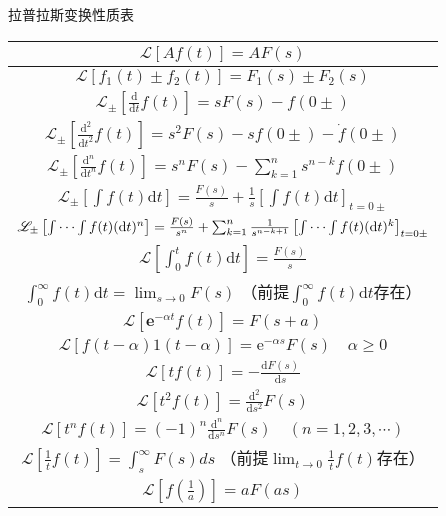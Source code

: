 \newpage
拉普拉斯变换性质表

\begin{centering}
    \renewcommand{\arraystretch}{2}
    \begin{longtable}{|c|}
        \hline
        $\mathscr{L}[A f(t)]=A F(s)$\\  \hline
        $\mathscr{L}\left[f_{1}(t) \pm f_{2}(t)\right]=F_{1}(s) \pm F_{2}(s)$\\  \hline
        $\mathscr{L}_{ \pm}\left[\frac{\mathrm{d}}{\mathrm{d} t} f(t)\right]=s F(s)-f(0 \pm)$\\  \hline
        $\mathscr{L}_{ \pm}\left[\frac{\mathrm{d}^{2}}{\mathrm{d} t^{2}} f(t)\right]=s^{2} F(s)-s f(0 \pm)-\dot{f}(0 \pm)$\\  \hline
        $\mathscr{L}_{ \pm}\left[\frac{\mathrm{d}^{n}}{\mathrm{d} t^{n}} f(t)\right]=s^{n} F(s)-\sum_{k=1}^{n} s^{n-k} f(0 \pm)$\\  \hline
        $\mathscr{L}_{ \pm}\left[\int f(t) \mathrm{d} t\right]=\frac{F(s)}{s}+\frac{1}{s}\left[\int f(t) \mathrm{d} t\right]_{t=0 \pm}$\\  \hline
        $\mathscr{L}_{\pm}\left[\int\cdots\int f(t)(\mathrm{d}t)^n\right]=\frac{F(s)}{s^n}+\sum_{k=1}^n\frac{1}{s^{n-k+1}}\left[\int\cdots\int f(t)(\mathrm{d}t)^k\right]_{t=0\pm}$\\  \hline
        $\mathscr{L}\left[\int_{0}^{t} f(t) \mathrm{d} t\right]=\frac{F(s)}{s}$\\  \hline
        $\int_{0}^{\infty} f(t) \mathrm{d} t=\lim _{s \rightarrow 0} F(s)$ （前提$\int_{0}^{\infty} f(t) \mathrm{d} t$存在）\\  \hline
        $\mathscr{L}\left[\mathbf{e}^{-\alpha t} f(t)\right]=F(s+a)$\\  \hline
        $\mathscr{L}[f(t-\alpha) 1(t-\alpha)]=\mathrm{e}^{-\alpha s} F(s) \quad \alpha \geq 0$\\  \hline
        $\mathscr{L}[t f(t)]=-\frac{\mathrm{d} F(s)}{\mathrm{d} s}$\\  \hline
        $\mathscr{L}\left[t^{2} f(t)\right]=\frac{\mathrm{d}^{2}}{\mathrm{d} s^{2}} F(s)$\\  \hline
        $\mathscr{L}\left[t^{n} f(t)\right]=(-1)^{n} \frac{\mathrm{d}^{n}}{\mathrm{d} s^{n}} F(s) \quad(n=1,2,3, \cdots)$\\  \hline
        $\mathscr{L}\left[\frac{1}{t} f(t)\right]=\int_{s}^{\infty} F(s) d s$ （前提$\lim _{t \rightarrow 0} \frac{1}{t} f(t)$存在）\\  \hline
        $\mathscr{L}\left[f\left(\frac{1}{a}\right)\right]=a F(a s)$\\  \hline

\end{longtable}
\end{centering}
